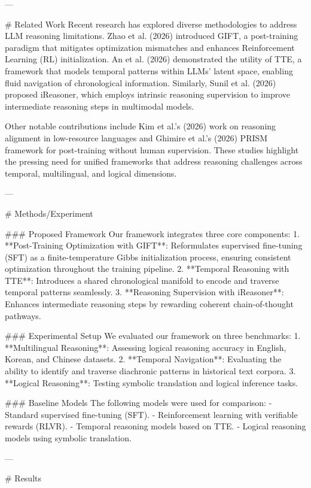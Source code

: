 ---

# Related Work  
Recent research has explored diverse methodologies to address LLM reasoning limitations. Zhao et al. (2026) introduced GIFT, a post-training paradigm that mitigates optimization mismatches and enhances Reinforcement Learning (RL) initialization. An et al. (2026) demonstrated the utility of TTE, a framework that models temporal patterns within LLMs' latent space, enabling fluid navigation of chronological information. Similarly, Sunil et al. (2026) proposed iReasoner, which employs intrinsic reasoning supervision to improve intermediate reasoning steps in multimodal models.  

Other notable contributions include Kim et al.'s (2026) work on reasoning alignment in low-resource languages and Ghimire et al.'s (2026) PRISM framework for post-training without human supervision. These studies highlight the pressing need for unified frameworks that address reasoning challenges across temporal, multilingual, and logical dimensions.  

---

# Methods/Experiment  

### Proposed Framework  
Our framework integrates three core components:  
1. **Post-Training Optimization with GIFT**: Reformulates supervised fine-tuning (SFT) as a finite-temperature Gibbs initialization process, ensuring consistent optimization throughout the training pipeline.  
2. **Temporal Reasoning with TTE**: Introduces a shared chronological manifold to encode and traverse temporal patterns seamlessly.  
3. **Reasoning Supervision with iReasoner**: Enhances intermediate reasoning steps by rewarding coherent chain-of-thought pathways.  

### Experimental Setup  
We evaluated our framework on three benchmarks:  
1. **Multilingual Reasoning**: Assessing logical reasoning accuracy in English, Korean, and Chinese datasets.  
2. **Temporal Navigation**: Evaluating the ability to identify and traverse diachronic patterns in historical text corpora.  
3. **Logical Reasoning**: Testing symbolic translation and logical inference tasks.  

### Baseline Models  
The following models were used for comparison:  
- Standard supervised fine-tuning (SFT).  
- Reinforcement learning with verifiable rewards (RLVR).  
- Temporal reasoning models based on TTE.  
- Logical reasoning models using symbolic translation.  

---

# Results  

